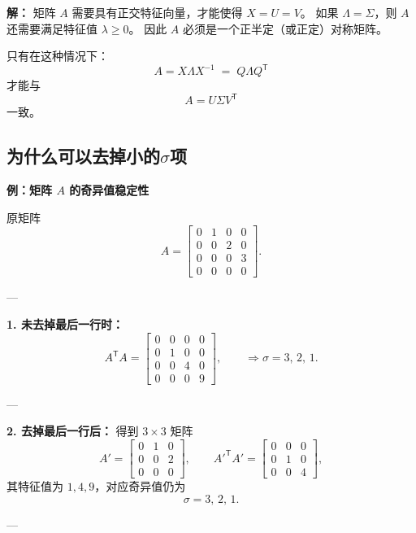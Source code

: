 \medskip
\textbf{解：}  
矩阵 $A$ 需要具有正交特征向量，才能使得 $X = U = V$。  
如果 $\Lambda = \Sigma$，则 $A$ 还需要满足特征值 $\lambda \geq 0$。  
因此 $A$ 必须是一个正半定（或正定）对称矩阵。  

只有在这种情况下：
\[
A = X \Lambda X^{-1} \;=\; Q \Lambda Q^{\mathsf T}
\]
才能与
\[
A = U \Sigma V^{\mathsf T}
\]
一致。

\subsection{为什么可以去掉小的$\sigma$项}
\textbf{例：矩阵 $A$ 的奇异值稳定性}

原矩阵
\[
A =
\begin{bmatrix}
0 & 1 & 0 & 0 \\
0 & 0 & 2 & 0 \\
0 & 0 & 0 & 3 \\
0 & 0 & 0 & 0
\end{bmatrix}.
\]

---

\textbf{1. 未去掉最后一行时：}  
\[
A^{\mathsf T}A = 
\begin{bmatrix}
0 & 0 & 0 & 0 \\
0 & 1 & 0 & 0 \\
0 & 0 & 4 & 0 \\
0 & 0 & 0 & 9
\end{bmatrix},
\qquad
\Rightarrow \sigma = 3,\,2,\,1.
\]

---

\textbf{2. 去掉最后一行后：}  
得到 $3\times 3$ 矩阵
\[
A' =
\begin{bmatrix}
0 & 1 & 0 \\
0 & 0 & 2 \\
0 & 0 & 0
\end{bmatrix},
\qquad
A'^{\mathsf T}A' =
\begin{bmatrix}
0 & 0 & 0 \\
0 & 1 & 0 \\
0 & 0 & 4
\end{bmatrix},
\]
其特征值为 $1,4,9$，对应奇异值仍为
\[
\sigma = 3,\,2,\,1.
\]

---

